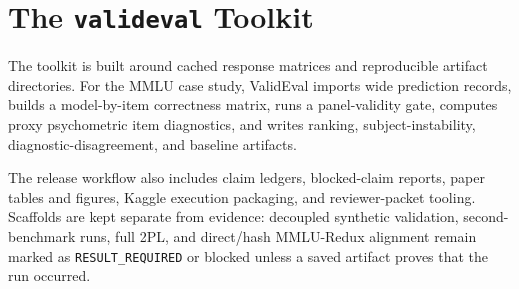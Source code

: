\section{The \texttt{valideval} Toolkit}

The toolkit is built around cached response matrices and reproducible artifact directories. For the
MMLU case study, ValidEval imports wide prediction records, builds a model-by-item correctness
matrix, runs a panel-validity gate, computes proxy psychometric item diagnostics, and writes
ranking, subject-instability, diagnostic-disagreement, and baseline artifacts.

The release workflow also includes claim ledgers, blocked-claim reports, paper tables and figures,
Kaggle execution packaging, and reviewer-packet tooling. Scaffolds are kept separate from evidence:
decoupled synthetic validation, second-benchmark runs, full 2PL, and direct/hash MMLU-Redux
alignment remain marked as \texttt{RESULT\_REQUIRED} or blocked unless a saved artifact proves that
the run occurred.
